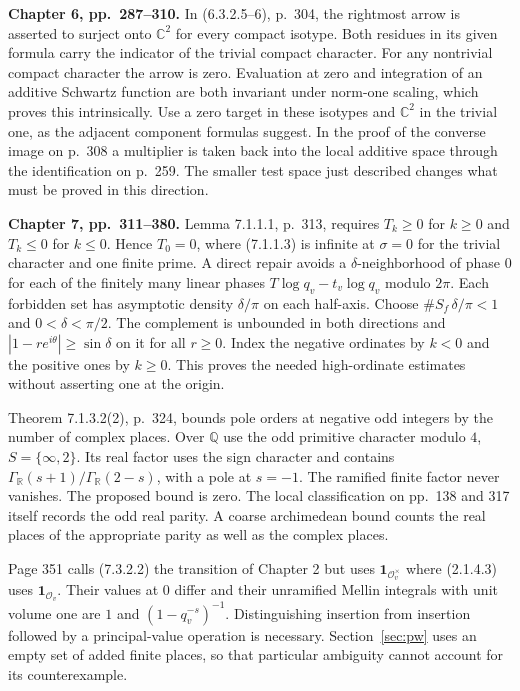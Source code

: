\documentclass[11pt,letterpaper]{article}
\newcommand{\R}{\mathbb R}
\newcommand{\C}{\mathbb C}
\newcommand{\Q}{\mathbb Q}
\newcommand{\OO}{\mathcal O}
\newcommand{\one}{\mathbf 1}
\newcommand{\head}[1]{\par\smallskip\textbf{#1}\enspace}
\begin{document}
\head{Chapter 6, pp.~287--310.} In (6.3.2.5--6), p.~304, the rightmost arrow is asserted to surject onto $\C^2$ for every compact isotype. Both residues in its given formula carry the indicator of the trivial compact character. For any nontrivial compact character the arrow is zero. Evaluation at zero and integration of an additive Schwartz function are both invariant under norm-one scaling, which proves this intrinsically. Use a zero target in these isotypes and $\C^2$ in the trivial one, as the adjacent component formulas suggest. In the proof of the converse image on p.~308 a multiplier is taken back into the local additive space through the identification on p.~259. The smaller test space just described changes what must be proved in this direction.

\head{Chapter 7, pp.~311--380.}
Lemma 7.1.1.1, p.~313, requires $T_k\ge0$ for $k\ge0$ and $T_k\le0$ for $k\le0$. Hence $T_0=0$, where (7.1.1.3) is infinite at $\sigma=0$ for the trivial character and one finite prime. A direct repair avoids a $\delta$-neighborhood of phase $0$ for each of the finitely many linear phases $T\log q_v-t_v\log q_v$ modulo $2\pi$. Each forbidden set has asymptotic density $\delta/\pi$ on each half-axis. Choose $\#S_f\,\delta/\pi<1$ and $0<\delta<\pi/2$. The complement is unbounded in both directions and $|1-r e^{i\theta}|\ge\sin\delta$ on it for all $r\ge0$. Index the negative ordinates by $k<0$ and the positive ones by $k\ge0$. This proves the needed high-ordinate estimates without asserting one at the origin.

Theorem 7.1.3.2(2), p.~324, bounds pole orders at negative odd integers by the number of complex places. Over $\Q$ use the odd primitive character modulo $4$, $S=\{\infty,2\}$. Its real factor uses the sign character and contains $\Gamma_\R(s+1)/\Gamma_\R(2-s)$, with a pole at $s=-1$. The ramified finite factor never vanishes. The proposed bound is zero. The local classification on pp.~138 and 317 itself records the odd real parity. A coarse archimedean bound counts the real places of the appropriate parity as well as the complex places.

Page 351 calls (7.3.2.2) the transition of Chapter 2 but uses $\one_{\OO_v^\times}$ where (2.1.4.3) uses $\one_{\OO_v}$. Their values at $0$ differ and their unramified Mellin integrals with unit volume one are $1$ and $(1-q_v^{-s})^{-1}$. Distinguishing insertion from insertion followed by a principal-value operation is necessary. Section~\ref{sec:pw} uses an empty set of added finite places, so that particular ambiguity cannot account for its counterexample.
\end{document}
